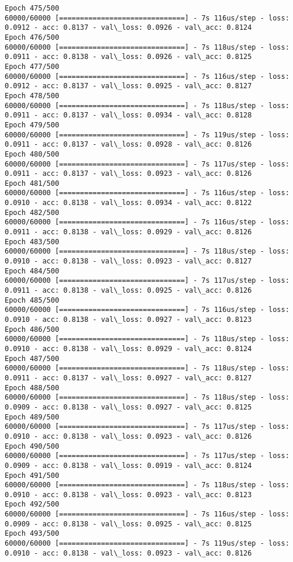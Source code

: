 \documentclass[11pt]{article}
\begin{document}
\begin{Verbatim}[commandchars=\\\{\}]
Epoch 475/500
60000/60000 [==============================] - 7s 116us/step - loss: 0.0912 - acc: 0.8137 - val\_loss: 0.0926 - val\_acc: 0.8124
Epoch 476/500
60000/60000 [==============================] - 7s 118us/step - loss: 0.0911 - acc: 0.8138 - val\_loss: 0.0926 - val\_acc: 0.8125
Epoch 477/500
60000/60000 [==============================] - 7s 116us/step - loss: 0.0912 - acc: 0.8137 - val\_loss: 0.0925 - val\_acc: 0.8127
Epoch 478/500
60000/60000 [==============================] - 7s 118us/step - loss: 0.0911 - acc: 0.8137 - val\_loss: 0.0934 - val\_acc: 0.8128
Epoch 479/500
60000/60000 [==============================] - 7s 119us/step - loss: 0.0911 - acc: 0.8137 - val\_loss: 0.0928 - val\_acc: 0.8126
Epoch 480/500
60000/60000 [==============================] - 7s 117us/step - loss: 0.0911 - acc: 0.8137 - val\_loss: 0.0923 - val\_acc: 0.8126
Epoch 481/500
60000/60000 [==============================] - 7s 116us/step - loss: 0.0910 - acc: 0.8138 - val\_loss: 0.0934 - val\_acc: 0.8122
Epoch 482/500
60000/60000 [==============================] - 7s 116us/step - loss: 0.0911 - acc: 0.8138 - val\_loss: 0.0929 - val\_acc: 0.8126
Epoch 483/500
60000/60000 [==============================] - 7s 118us/step - loss: 0.0910 - acc: 0.8138 - val\_loss: 0.0923 - val\_acc: 0.8127
Epoch 484/500
60000/60000 [==============================] - 7s 117us/step - loss: 0.0911 - acc: 0.8138 - val\_loss: 0.0925 - val\_acc: 0.8126
Epoch 485/500
60000/60000 [==============================] - 7s 116us/step - loss: 0.0910 - acc: 0.8138 - val\_loss: 0.0927 - val\_acc: 0.8123
Epoch 486/500
60000/60000 [==============================] - 7s 118us/step - loss: 0.0910 - acc: 0.8138 - val\_loss: 0.0929 - val\_acc: 0.8124
Epoch 487/500
60000/60000 [==============================] - 7s 118us/step - loss: 0.0911 - acc: 0.8137 - val\_loss: 0.0927 - val\_acc: 0.8127
Epoch 488/500
60000/60000 [==============================] - 7s 118us/step - loss: 0.0909 - acc: 0.8138 - val\_loss: 0.0927 - val\_acc: 0.8125
Epoch 489/500
60000/60000 [==============================] - 7s 117us/step - loss: 0.0910 - acc: 0.8138 - val\_loss: 0.0923 - val\_acc: 0.8126
Epoch 490/500
60000/60000 [==============================] - 7s 117us/step - loss: 0.0909 - acc: 0.8138 - val\_loss: 0.0919 - val\_acc: 0.8124
Epoch 491/500
60000/60000 [==============================] - 7s 118us/step - loss: 0.0910 - acc: 0.8138 - val\_loss: 0.0923 - val\_acc: 0.8123
Epoch 492/500
60000/60000 [==============================] - 7s 116us/step - loss: 0.0909 - acc: 0.8138 - val\_loss: 0.0925 - val\_acc: 0.8125
Epoch 493/500
60000/60000 [==============================] - 7s 119us/step - loss: 0.0910 - acc: 0.8138 - val\_loss: 0.0923 - val\_acc: 0.8126

\end{Verbatim}
\end{document}

